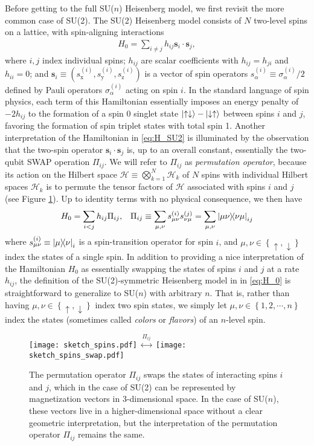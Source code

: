\documentclass[nofootinbib,notitlepage,11pt]{revtex4-2}
\newcommand{\p}[1]{\left(#1\right)} %
\renewcommand{\set}[1]{\left\{#1\right\}} %
\renewcommand{\c}{\cdot} %
\newcommand{\m}{\bm} %
\newcommand{\1}{\mathds{1}}
\newcommand{\up}{\uparrow}
\newcommand{\dn}{\downarrow}
\newcommand{\x}{\text{x}}
\newcommand{\y}{\text{y}}
\newcommand{\z}{\text{z}}
\renewcommand{\H}{\mathcal{H}}
\begin{document}
Before getting to the full SU($n$) Heisenberg model, we first revisit
the more common case of SU(2).  The SU(2) Heisenberg model consists of
$N$ two-level spins on a lattice, with spin-aligning interactions
\begin{align}
  H_0 = \sum_{i\ne j} h_{ij} \m s_i \c\m s_j,
  \label{eq:H_SU2}
\end{align}
where $i,j$ index individual spins; $h_{ij}$ are scalar coefficients
with $h_{ij}=h_{ji}$ and $h_{ii}=0$; and
$\m s_i\equiv\p{s_\x^{(i)},s_\y^{(i)},s_\z^{(i)}}$ is a vector of spin
operators $s_\alpha^{(i)}\equiv\sigma_\alpha^{(i)}/2$ defined by Pauli
operators $\sigma_\alpha^{(i)}$ acting on spin $i$.  In the standard
language of spin physics, each term of this Hamiltonian essentially
imposes an energy penalty of $-2h_{ij}$ to the formation of a spin 0
singlet state $\ket{\up\dn}-\ket{\dn\up}$ between spins $i$ and $j$,
favoring the formation of spin triplet states with total spin 1.
Another interpretation of the Hamiltonian in \eqref{eq:H_SU2} is
illuminated by the observation that the two-spin operator
$\m s_i\c\m s_j$ is, up to an overall constant, essentially the
two-qubit SWAP operation $\Pi_{ij}$.  We will refer to $\Pi_{ij}$ as
{\it permutation operator}, because its action on the Hilbert space
$\H\equiv\bigotimes_{k=1}^N\H_k$ of $N$ spins with individual Hilbert
spaces $\H_k$ is to permute the tensor factors of $\H$ associated with
spins $i$ and $j$ (see Figure \ref{fig:sketch_spins}).  Up to identity
terms with no physical consequence, we then have
\begin{align}
  H_0 = \sum_{i<j} h_{ij} \Pi_{ij},
  &&
  \Pi_{ij} \equiv \sum_{\mu,\nu} s_{\mu\nu}^{(i)} s_{\nu\mu}^{(j)}
  = \sum_{\mu,\nu} \op{\mu\nu}{\nu\mu}_{ij}
  \label{eq:H_0}
\end{align}
where $s_{\mu\nu}^{(i)}\equiv\op{\mu}{\nu}_i$ is a spin-transition
operator for spin $i$, and $\mu,\nu\in\set{\up,\dn}$ index the states
of a single spin.  In addition to providing a nice interpretation of
the Hamiltonian $H_0$ as essentially swapping the states of spins $i$
and $j$ at a rate $h_{ij}$, the definition of the SU(2)-symmetric
Heisenberg model in in \eqref{eq:H_0} is straightforward to generalize
to SU($n$) with arbitrary $n$.  That is, rather than having
$\mu,\nu\in\set{\up,\dn}$ index two spin states, we simply let
$\mu,\nu\in\set{1,2,\cdots,n}$ index the states (sometimes called {\it
  colors} or {\it flavors}) of an $n$-level spin.

\begin{figure}
  \centering
  \texttt{[image: sketch\_spins.pdf]}
  $\stackrel{\displaystyle\Pi_{ij}}
  {\displaystyle\longleftrightarrow}$
  \texttt{[image: sketch\_spins\_swap.pdf]}
  \caption{The permutation operator $\Pi_{ij}$ swaps the states of
    interacting spins $i$ and $j$, which in the case of SU(2) can be
    represented by magnetization vectors in 3-dimensional space.  In
    the case of SU($n$), these vectors live in a higher-dimensional
    space without a clear geometric interpretation, but the
    interpretation of the permutation operator $\Pi_{ij}$ remains the
    same.}
  \label{fig:sketch_spins}
\end{figure}
\end{document}
